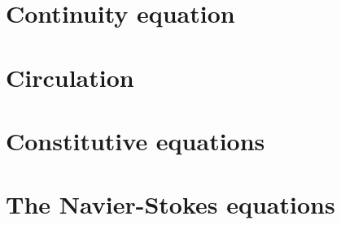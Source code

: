 \documentclass[12pt]{report}
\begin{document}
\chapter{Continuity equation}




%

\chapter{Circulation}




%


%

\chapter{Constitutive equations}



\chapter{The Navier-Stokes equations} \label{chap:N-S}
\end{document}
